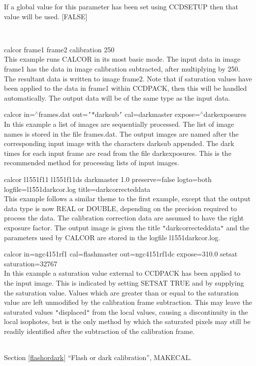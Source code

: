\documentclass[twoside,11pt]{article}
\newcommand{\htmlref}[2]{#1}
\newcommand{\latexhtml}[2]{#1}
\renewcommand{\_}{\texttt{\symbol{95}}}
\newcommand{\qt}[1]{{\tt "}#1{\tt "}}
\newcommand{\qs}[1]{{\tt '}#1{\tt '}}
\newcommand{\routine}[1]{{\sc #1}}
\newcommand{\xroutine}[1]{\htmlref{{\sc #1}}{#1}}
\newcommand{\secref}[2]{\latexhtml{Section \ref{#1} ``#2''}{``\htmlref{#2}{#1}''}}
\newcommand{\sstexamples}[1]{
   \item[Examples:] \mbox{} \\
   \vspace{-3.5ex}
   \begin{description}
      #1
   \end{description}
}
\newcommand{\sstexamplesubsection}[2]{\sloppy \item{\ssttt #1} \mbox{} \\ #2 }
\newcommand{\sstnotes}[1]{\item[Notes:] \mbox{} \\[1.3ex] #1}
\newcommand{\sstdiytopic}[2]{\item[#1:] \mbox{} \\[1.3ex] #2}
\newcommand{\sstitemlist}[1]{
  \mbox{} \\
  \vspace{-3.5ex}
  \begin{itemize}
     #1
  \end{itemize}
}
\newcommand{\sstexamples}[1]{
      \item[Examples:] \\
      \begin{description}
         #1
      \end{description}
      \\
   }
\newcommand{\sstexamplesubsection}[2]{\item[{\ssttt #1}] #2}
\newcommand{\sstnotes}[1]{\item[Notes:] #1 }
\newcommand{\sstdiytopic}[2]{\item[{#1:}] #2 }
\newcommand{\sstitemlist}[1]{
      \begin{itemize}
         #1
      \end{itemize}
      \\
   }
\begin{document}
{{{         If a global value for this parameter has been set using 
         \xroutine{CCDSETUP} then that value will be used.
         [FALSE]
      }
   }
   \sstexamples{
      \sstexamplesubsection{
         calcor frame1 frame2 calibration 250
      } {
         This example runs \routine{CALCOR} in its most basic mode. The input data
         in image frame1 has the data in image calibration subtracted, after
         multiplying by 250. The resultant data is written to image
         frame2. Note that if saturation values have been applied to the
         data in frame1 within CCDPACK, then this will be handled
         automatically. The output data will be of the same type as the
         input data.
      }
      \sstexamplesubsection{
         calcor in=$^\wedge$frames.dat out=\qs{$*$\_darksub} cal=dark\_master
                expose=$^\wedge$dark\_exposures
      } {
         In this example a list of images are sequentially processed. The
         list of image names is stored in the file frames.dat. The output
         images are named after the corresponding input image with the
         characters \_darksub appended. The dark times for each input
         frame are read from the file dark\_exposures. This is the
         recommended method for processing lists of input images.
      }
      \sstexamplesubsection{
         calcor l1551\_f11 l1551\_f11\_ds dark\_master 1.0 preserve=false
             logto=both logfile=l1551\_darkcor.log
             title=dark\_corrected\_data
      } {
         This example follows a similar theme to the first example,
         except that the output data type is now \_REAL or \_DOUBLE,
         depending on the precision required to process the data. The
         calibration correction data are assumed to have the right
         exposure factor. The output image is given the title
         \qt{dark\_corrected\_data} and the parameters used by \routine{CALCOR}
         are
         stored in the logfile l1551\_darkcor.log.
      }
      \sstexamplesubsection{
         calcor in=ngc4151r\_f1 cal=flash\_master out=ngc4151r\_f1\_dc
             expose=310.0 setsat saturation=32767
      } {
         In this example a saturation value external to CCDPACK has
         been applied to the input image. This is indicated by setting
         SETSAT TRUE and by supplying the saturation value. Values
         which are greater than or equal to the saturation value are
         left unmodified by the calibration frame subtraction. This may
         leave the saturated values \qt{displaced} from the local values,
         causing a discontinuity in the local isophotes, but is the
         only method by which the saturated pixels may still be
         readily identified after the subtraction of the calibration
         frame.
      }
   }
   \sstdiytopic{
      See also
   } {
      \secref{flashordark}{Flash or dark calibration}, \xroutine{MAKECAL}.
   }
   \sstnotes{
      \sstitemlist{

}}}
\end{document}
